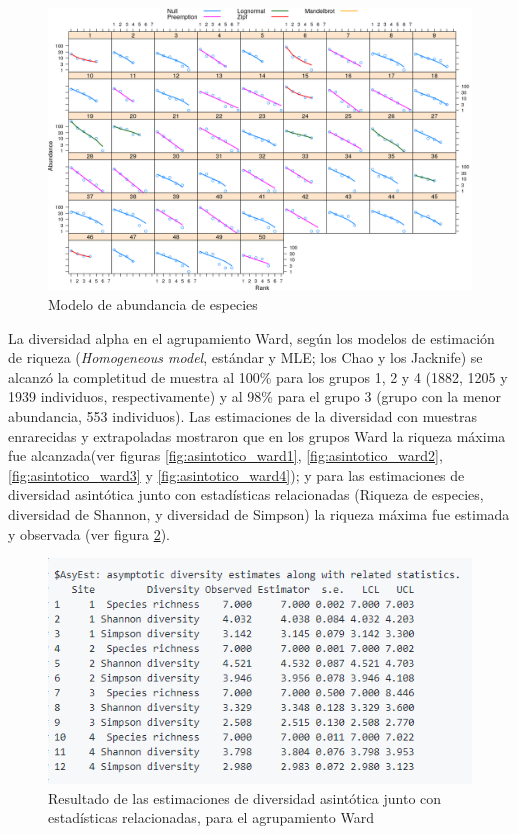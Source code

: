 \documentclass[11pt,]{article}
\begin{document}
\begin{figure}
\centering
\includegraphics{modelodeabundancia.png}
\caption{Modelo de abundancia de especies \label{fig:modelo_abundancia}}
\end{figure}

La diversidad alpha en el agrupamiento Ward, según los modelos de
estimación de riqueza (\emph{Homogeneous model}, estándar y MLE; los
Chao y los Jacknife) se alcanzó la completitud de muestra al 100\% para
los grupos 1, 2 y 4 (1882, 1205 y 1939 individuos, respectivamente) y al
98\% para el grupo 3 (grupo con la menor abundancia, 553 individuos).
Las estimaciones de la diversidad con muestras enrarecidas y
extrapoladas mostraron que en los grupos Ward la riqueza máxima fue
alcanzada(ver figuras \ref{fig:asintotico_ward1},
\ref{fig:asintotico_ward2}, \ref{fig:asintotico_ward3} y
\ref{fig:asintotico_ward4}); y para las estimaciones de diversidad
asintótica junto con estadísticas relacionadas (Riqueza de especies,
diversidad de Shannon, y diversidad de Simpson) la riqueza máxima fue
estimada y observada (ver figura \ref{fig:sintotico_ward}).

\begin{figure}
\centering
\includegraphics{sintotico_ward.png}
\caption{Resultado de las estimaciones de diversidad asintótica junto
con estadísticas relacionadas, para el agrupamiento Ward
\label{fig:sintotico_ward}}
\end{figure}
\end{document}
